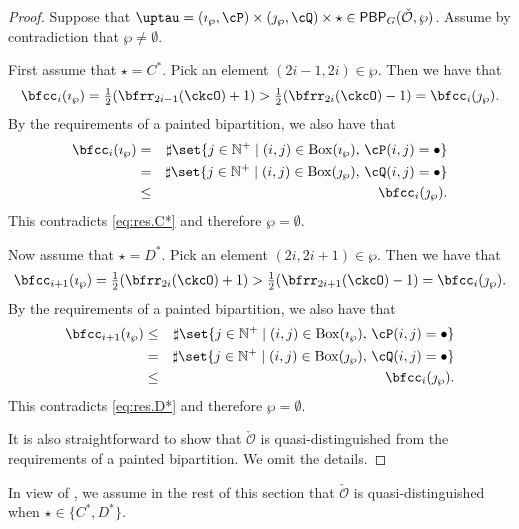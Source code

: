 \documentclass[12pt]{amsart}
\newcommand{\BN}{{\mathbb {N}}}
\newcommand{\CO}{{\mathcal {O}}}
\numberwithin{equation}{section}
\theoremstyle{remark}
\def\half{{\tfrac{1}{2}}}
\def\BOX#1{\mathrm{Box}(#1)}
\def\PBP{\mathsf{PBP}}
\begin{document}
\begin{proof}
 Suppose that
  $\uptau = (\imath_{\wp}, \cP)\times (\jmath_{\wp},\cQ)\times \star\in \PBP_{G}(\check \CO, \wp)$.
Assume by contradiction that  $\wp \neq \emptyset$.

   First assume that  $\star = C^{*}$.  Pick an element $(2i-1, 2i)\in \wp$. Then we have that
  \begin{equation}\label{eq:res.C*}
    \bfcc_{i}(\imath_{\wp}) = \half(\bfrr_{2i-1}(\ckcO)+1)>
    \half(\bfrr_{2i}(\ckcO)-1) = \bfcc_{i}(\jmath_{\wp}).
      \end{equation}
   By the requirements of a painted bipartition, we also have that
  \begin{eqnarray*}
    \bfcc_{i}(\imath_{\wp})& = &\sharp\set{j\in \BN^+ \mid (i,j)\in \BOX{\imath_\wp}, \, \cP(i,j)=\bullet} \\
    &= &\sharp\set{j\in \BN^+\mid  (i,j)\in \BOX{\jmath_\wp}, \, \cQ(i,j)=\bullet} \\
    &\leq & \bfcc_{i}(\jmath_{\wp}).
  \end{eqnarray*}
 This contradicts \eqref{eq:res.C*} and therefore $\wp = \emptyset$.



  Now assume that $\star = D^{*}$. Pick an element  $(2i, 2i+1)\in \wp$.
  Then we have that
  \begin{equation}\label{eq:res.D*}
    \bfcc_{i+1}(\imath_{\wp}) = \half(\bfrr_{2i}(\ckcO)+1)>
    \half(\bfrr_{2i+1}(\ckcO)-1) = \bfcc_{i}(\jmath_{\wp}).
  \end{equation}
      By the requirements of a painted bipartition, we also have that
  \begin{eqnarray*}
  \bfcc_{i+1}(\imath_{\wp})& \leq & \sharp\set{j\in \BN^+ \mid (i,j)\in \BOX{\imath_\wp}, \,  \cP(i,j)=\bullet} \\
  &=&\sharp\set{j\in \BN^+ \mid (i,j)\in \BOX{\jmath_\wp}, \,  \cQ(i,j)=\bullet} \\
  &\leq & \bfcc_{i}(\jmath_{\wp}).  \end{eqnarray*}
 This contradicts \eqref{eq:res.D*} and therefore  $\wp = \emptyset$.

It is also straightforward to show that $\check \CO$ is quasi-distinguished from the requirements of a painted bipartition. We omit the details.
\end{proof}

In view of , we  assume in the rest of this section that $\check \CO$ is quasi-distinguished when $\star\in \{C^*,D^*\}$.
\end{document}
